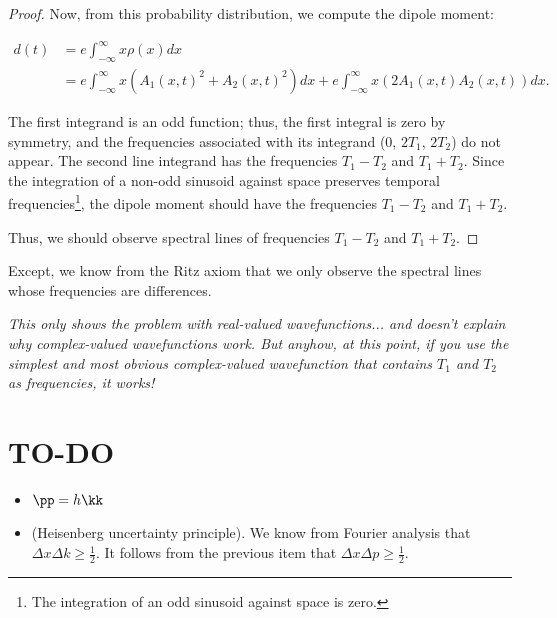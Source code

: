 \documentclass{article}
\begin{document}
\begin{proof}
	Now, from this probability distribution, we compute the dipole moment:
	
	\begin{align*}
		d(t) &= e \int_{-\infty}^\infty x \rho(x) dx \\
		&= e \int_{-\infty}^\infty x (A_1(x, t)^2 + A_2(x, t)^2) dx + e \int_{-\infty}^\infty x (2A_1(x, t)A_2(x, t)) dx.
	\end{align*}
	
	The first integrand is an odd function; thus, the first integral is zero by symmetry, and the frequencies associated with its integrand ($0$, $2T_1$, $2T_2$) do not appear. The second line integrand has the frequencies $T_1 - T_2$ and $T_1 + T_2$. Since the integration of a non-odd sinusoid against space preserves temporal frequencies\footnote{The integration of an odd sinusoid against space is zero.}, the dipole moment should have the frequencies $T_1 - T_2$ and $T_1 + T_2$.
	
	Thus, we should observe spectral lines of frequencies $T_1 - T_2$ and $T_1 + T_2$.
\end{proof}

Except, we know from the Ritz axiom that we only observe the spectral lines whose frequencies are differences.

\textit{This only shows the problem with real-valued wavefunctions... and doesn't explain why complex-valued wavefunctions work. But anyhow, at this point, if you use the simplest and most obvious complex-valued wavefunction that contains $T_1$ and $T_2$ as frequencies, it works!}

\section*{TO-DO}

\begin{itemize}
	\item $\pp = h\kk$
	\item (Heisenberg uncertainty principle). We know from Fourier analysis that $\Delta x \Delta k \geq \frac{1}{2}$. It follows from the previous item that $\Delta x \Delta p \geq \frac{1}{2}$.
\end{itemize}
\end{document}
